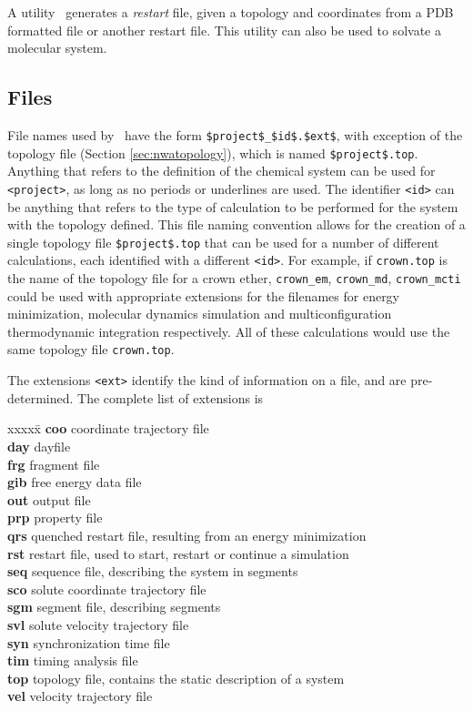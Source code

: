 A utility \nwrst\ generates a {\it restart} file, given a topology
and coordinates from a PDB formatted file or another restart file.
This utility can also be used to solvate a molecular system.

\subsection{Files}
\label{sec:nwafilenames}

File names used by \nwargos\ have the form \verb+$project$_$id$.$ext$+, with
exception of the topology file (Section \ref{sec:nwatopology}), which is named 
\verb+$project$.top+.
Anything that refers to the definition of the chemical system can be used
for \verb+<project>+, as long as no periods or underlines are used.
The identifier \verb+<id>+ can be anything that refers to the type of 
calculation to be performed for the system with the topology defined.
This file naming convention allows for the creation of a single
topology file \verb+$project$.top+ that can be used for a number of 
different calculations, each identified with a different \verb+<id>+.
For example, if {\tt crown.top} is the name of the topology file for
a crown ether, {\tt crown\_em}, {\tt crown\_md}, {\tt crown\_mcti} could
be used with appropriate extensions for the filenames for energy
minimization, molecular dynamics simulation and multiconfiguration
thermodynamic integration respectively. All of these calculations
would use the same topology file {\tt crown.top}.

\label{sec:nwaextensions}

The extensions \verb+<ext>+ identify the kind of information on a file,
and are pre-determined. 
The complete list of extensions is
\begin{tabbing}
xxxxx\=\kill
{\bf coo} \> coordinate trajectory file\\
{\bf day} \> dayfile\\
{\bf frg} \> fragment file\\
{\bf gib} \> free energy data file\\
{\bf out} \> output file\\
{\bf prp} \> property file\\
{\bf qrs} \> quenched restart file, resulting from an energy minimization\\
{\bf rst} \> restart file, used to start, restart or continue a simulation \\
{\bf seq} \> sequence file, describing the system in segments\\
{\bf sco} \> solute coordinate trajectory file\\
{\bf sgm} \> segment file, describing segments\\
{\bf svl} \> solute velocity trajectory file\\
{\bf syn} \> synchronization time file\\
{\bf tim} \> timing analysis file\\
{\bf top} \> topology file, contains the static description of a system\\
{\bf vel} \> velocity trajectory file\\
\end{tabbing}


